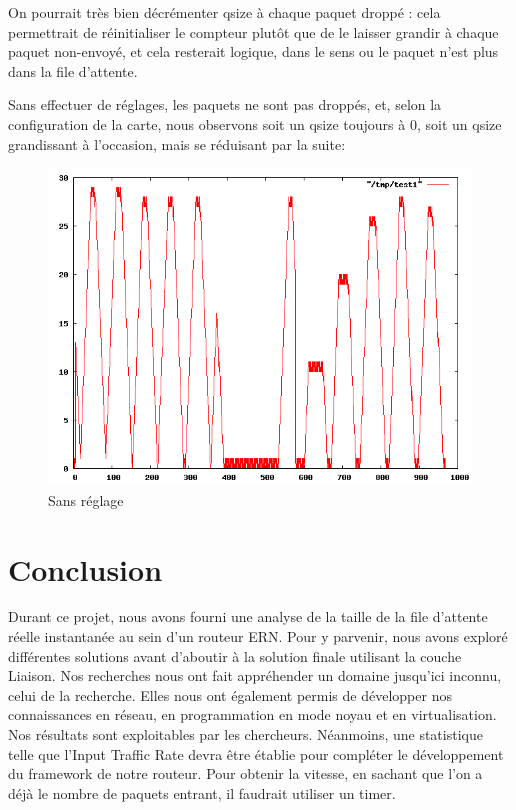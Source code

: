 \documentclass[a4paper]{article}
\begin{document}
On pourrait très bien décrémenter qsize à chaque paquet droppé : cela
permettrait de réinitialiser le compteur plutôt que de le laisser
grandir à chaque paquet non-envoyé, et cela resterait logique, dans le
sens ou le paquet n'est plus dans la file d'attente.

Sans effectuer de  réglages, les paquets ne sont pas droppés, et, selon
la configuration de la carte, nous observons soit un
qsize toujours à 0, soit un qsize grandissant à l'occasion, mais se
réduisant par la suite:
\begin{figure}[!ht]
	\centering
	\includegraphics[scale=.5]{qsize_default.png}
	\caption{\label{qsize_default} Sans réglage}
\end{figure}

\section{Conclusion}
Durant ce projet, nous avons fourni une analyse de la taille de la file d'attente
réelle instantanée au sein d'un routeur ERN. Pour y parvenir, nous avons exploré 
différentes solutions avant d'aboutir à la solution finale utilisant la couche Liaison. 
Nos recherches nous ont fait appréhender un domaine jusqu'ici inconnu,
celui de la recherche. Elles nous ont également permis de développer nos connaissances
en réseau, en programmation en mode noyau et en virtualisation. 
Nos résultats sont exploitables par les chercheurs. Néanmoins, une statistique telle que
l'Input Traffic Rate devra être établie pour compléter le développement du framework
de notre routeur. Pour obtenir la vitesse, en sachant que l'on a déjà le nombre
de paquets entrant, il faudrait utiliser un timer.
\end{document}
